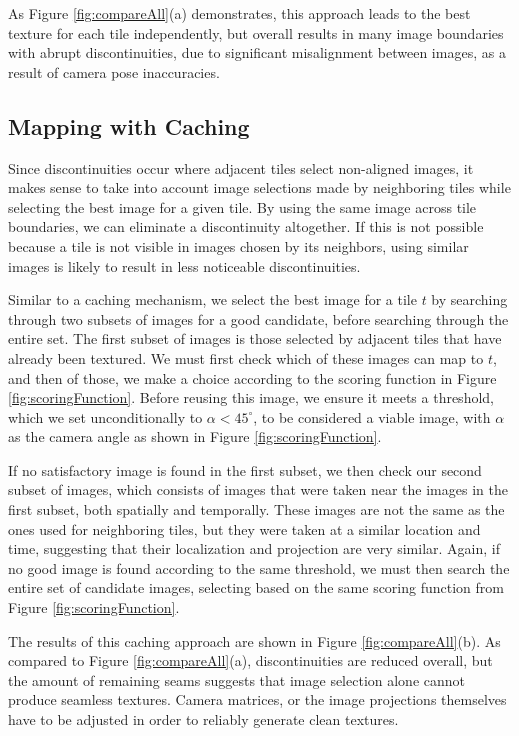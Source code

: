 \documentclass[10pt,twocolumn,letterpaper]{article}
\begin{document}
As Figure \ref{fig:compareAll}(a) demonstrates, this approach leads
to the best texture for each tile independently, but overall results
in many image boundaries with abrupt discontinuities, due to
significant misalignment between images, as a result of camera pose
inaccuracies.

\subsection{Mapping with Caching}
\label{sec:mappingWithCaching}
Since discontinuities occur where adjacent tiles select non-aligned
images, it makes sense to take into account image selections made by
neighboring tiles while selecting the best image for a given tile. By
using the same image across tile boundaries, we can eliminate a
discontinuity altogether. If this is not possible because a tile is
not visible in images chosen by its neighbors, using similar images is
likely to result in less noticeable discontinuities.

Similar to a caching mechanism, we select the best image for a tile
$t$ by searching through two subsets of images for a good candidate,
before searching through the entire set. The first subset of images is
those selected by adjacent tiles that have already been textured. We
must first check which of these images can map to $t$, and then of
those, we make a choice according to the scoring function in Figure
\ref{fig:scoringFunction}. Before reusing this image, we ensure it
meets a threshold, which we set unconditionally to $\alpha <
45^\circ$, to be considered a viable image, with $\alpha$ as the
camera angle as shown in Figure \ref{fig:scoringFunction}.

If no satisfactory image is found in the first subset, we then check
our second subset of images, which consists of images that were taken
near the images in the first subset, both spatially and
temporally. These images are not the same as the ones used for
neighboring tiles, but they were taken at a similar location and time,
suggesting that their localization and projection are very
similar. Again, if no good image is found according to the same
threshold, we must then search the entire set of candidate images,
selecting based on the same scoring function from Figure
\ref{fig:scoringFunction}.

The results of this caching approach are shown in Figure
\ref{fig:compareAll}(b). As compared to Figure
\ref{fig:compareAll}(a), discontinuities are reduced overall, but the
amount of remaining seams suggests that image selection alone cannot
produce seamless textures. Camera matrices, or the image projections
themselves have to be adjusted in order to reliably generate clean
textures.
\end{document}
